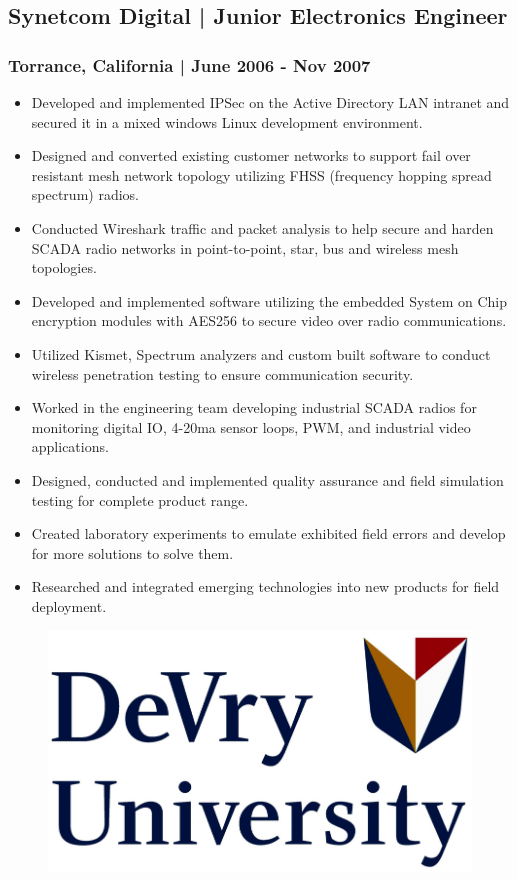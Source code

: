 \documentclass[letter,10pt]{article}
\begin{document}
\subsection*{Synetcom Digital | Junior Electronics Engineer}
\label{sec:org5e3b671}
\subsubsection*{Torrance, California | June 2006 - Nov 2007}
\label{sec:org3bc1226}
\begin{itemize}
\item Developed and implemented IPSec on the Active Directory LAN intranet and secured it in a mixed windows Linux development environment.
\item Designed and converted existing customer networks to support fail over resistant mesh network topology utilizing FHSS (frequency hopping spread spectrum) radios.
\item Conducted Wireshark traffic and packet analysis to help secure and harden SCADA radio networks in point-to-point, star, bus and wireless mesh topologies.
\item Developed and implemented software utilizing the embedded System on Chip encryption modules with AES256 to secure video over radio communications.
\item Utilized Kismet, Spectrum analyzers and custom built software to conduct wireless penetration testing to ensure communication security.
\item Worked in the engineering team developing industrial SCADA radios for monitoring digital IO, 4-20ma sensor loops, PWM, and industrial video applications.
\item Designed, conducted and implemented quality assurance and field simulation testing for complete product range.
\item Created laboratory experiments to emulate exhibited field errors and develop for more solutions to solve them.
\item Researched and integrated emerging technologies into new products for field deployment.
\end{itemize}

\begin{figure}
\includegraphics[width=0.8\linewidth]{./img/50p_cr_devry.jpg}
\end{figure}
\end{document}
